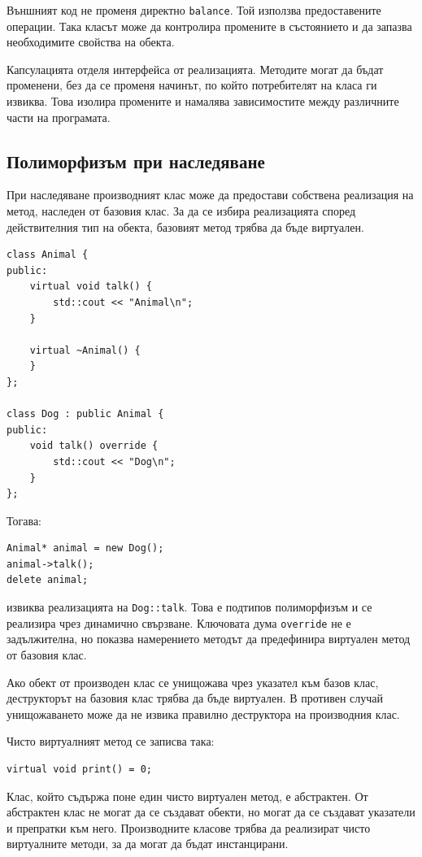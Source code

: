 Външният код не променя директно \texttt{balance}. Той използва предоставените операции. Така класът може да контролира промените в състоянието и да запазва необходимите свойства на обекта.

Капсулацията отделя интерфейса от реализацията. Методите могат да бъдат променени, без да се променя начинът, по който потребителят на класа ги извиква. Това изолира промените и намалява зависимостите между различните части на програмата.

\subsection{Полиморфизъм при наследяване}\label{s:16.4.1}

При наследяване производният клас може да предостави собствена реализация на метод, наследен от базовия клас. За да се избира реализацията според действителния тип на обекта, базовият метод трябва да бъде виртуален.

\begin{verbatim}
class Animal {
public:
    virtual void talk() {
        std::cout << "Animal\n";
    }

    virtual ~Animal() {
    }
};

class Dog : public Animal {
public:
    void talk() override {
        std::cout << "Dog\n";
    }
};
\end{verbatim}

Тогава:

\begin{verbatim}
Animal* animal = new Dog();
animal->talk();
delete animal;
\end{verbatim}

извиква реализацията на \texttt{Dog::talk}. Това е подтипов полиморфизъм и се реализира чрез динамично свързване. Ключовата дума \texttt{override} не е задължителна, но показва намерението методът да предефинира виртуален метод от базовия клас.

Ако обект от производен клас се унищожава чрез указател към базов клас, деструкторът на базовия клас трябва да бъде виртуален. В противен случай унищожаването може да не извика правилно деструктора на производния клас.

Чисто виртуалният метод се записва така:

\begin{verbatim}
virtual void print() = 0;
\end{verbatim}

Клас, който съдържа поне един чисто виртуален метод, е абстрактен. От абстрактен клас не могат да се създават обекти, но могат да се създават указатели и препратки към него. Производните класове трябва да реализират чисто виртуалните методи, за да могат да бъдат инстанцирани.

